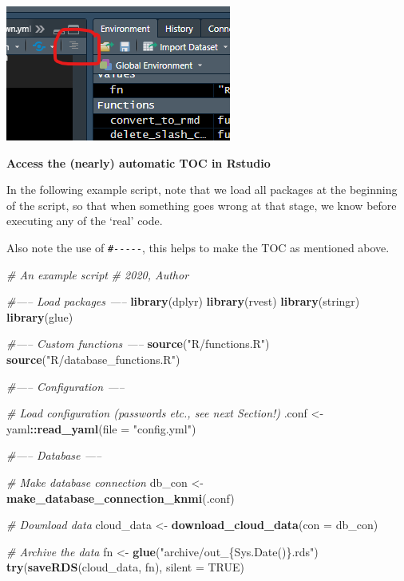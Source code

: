 \documentclass[]{book}
\newenvironment{Shaded}{\begin{snugshade}}{\end{snugshade}}
\newcommand{\CommentTok}[1]{\textcolor[rgb]{0.56,0.35,0.01}{\textit{#1}}}
\newcommand{\DataTypeTok}[1]{\textcolor[rgb]{0.13,0.29,0.53}{#1}}
\newcommand{\KeywordTok}[1]{\textcolor[rgb]{0.13,0.29,0.53}{\textbf{#1}}}
\newcommand{\NormalTok}[1]{#1}
\newcommand{\OperatorTok}[1]{\textcolor[rgb]{0.81,0.36,0.00}{\textbf{#1}}}
\newcommand{\OtherTok}[1]{\textcolor[rgb]{0.56,0.35,0.01}{#1}}
\newcommand{\StringTok}[1]{\textcolor[rgb]{0.31,0.60,0.02}{#1}}
\begin{document}
\includegraphics[width=0.3\linewidth]{screenshots/tablecontents_button}

\textbf{Access the (nearly) automatic TOC in Rstudio}

In the following example script, note that we load all packages at the beginning of the script, so that when something goes wrong at that stage, we know before executing any of the `real' code.

Also note the use of \texttt{\#-\/-\/-\/-\/-}, this helps to make the TOC as mentioned above.

\begin{Shaded}
\begin{Highlighting}[]
\CommentTok{# An example script}
\CommentTok{# 2020, Author}


\CommentTok{#----- Load packages -----}
\KeywordTok{library}\NormalTok{(dplyr)}
\KeywordTok{library}\NormalTok{(rvest)}
\KeywordTok{library}\NormalTok{(stringr)}
\KeywordTok{library}\NormalTok{(glue)}

\CommentTok{#----- Custom functions -----}
\KeywordTok{source}\NormalTok{(}\StringTok{"R/functions.R"}\NormalTok{)}
\KeywordTok{source}\NormalTok{(}\StringTok{"R/database_functions.R"}\NormalTok{)}

\CommentTok{#----- Configuration -----}

\CommentTok{# Load configuration (passwords etc., see next Section!)}
\NormalTok{.conf <-}\StringTok{ }\NormalTok{yaml}\OperatorTok{::}\KeywordTok{read_yaml}\NormalTok{(}\DataTypeTok{file =} \StringTok{"config.yml"}\NormalTok{)}

\CommentTok{#----- Database -----}

\CommentTok{# Make database connection}
\NormalTok{db_con <-}\StringTok{ }\KeywordTok{make_database_connection_knmi}\NormalTok{(.conf)}

\CommentTok{# Download data}
\NormalTok{cloud_data <-}\StringTok{ }\KeywordTok{download_cloud_data}\NormalTok{(}\DataTypeTok{con =}\NormalTok{ db_con)}

\CommentTok{# Archive the data}
\NormalTok{fn <-}\StringTok{ }\KeywordTok{glue}\NormalTok{(}\StringTok{"archive/out_\{Sys.Date()\}.rds"}\NormalTok{)}
\KeywordTok{try}\NormalTok{(}\KeywordTok{saveRDS}\NormalTok{(cloud_data, fn), }\DataTypeTok{silent =} \OtherTok{TRUE}\NormalTok{)}


\end{Highlighting}
\end{Shaded}
\end{document}
